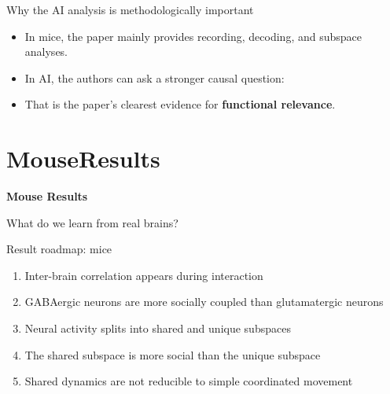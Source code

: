 \documentclass[aspectratio=169,11pt]{beamer}
\newcommand{\sectiondivider}[2]{
  \begin{frame}[plain]
    \vfill
    {\color{accentblue}\LARGE\bfseries #1\par}
    \vspace{0.5em}
    {\large #2\par}
    \vfill
  \end{frame}
}
\begin{document}
\begin{frame}{Why the AI analysis is methodologically important}
\begin{itemize}
  \item In mice, the paper mainly provides recording, decoding, and subspace analyses.
  \item In AI, the authors can ask a stronger causal question:
\end{itemize}
\begin{center}
\end{center}
\vspace{0.4em}
\begin{itemize}
  \item That is the paper's clearest evidence for \textbf{functional relevance}.
\end{itemize}
\end{frame}

\section{MouseResults}
\sectiondivider{Mouse Results}{What do we learn from real brains?}

\begin{frame}{Result roadmap: mice}
\begin{enumerate}
  \item Inter-brain correlation appears during interaction
  \item GABAergic neurons are more socially coupled than glutamatergic neurons
  \item Neural activity splits into shared and unique subspaces
  \item The shared subspace is more social than the unique subspace
  \item Shared dynamics are not reducible to simple coordinated movement
\end{enumerate}
\end{frame}
\end{document}
